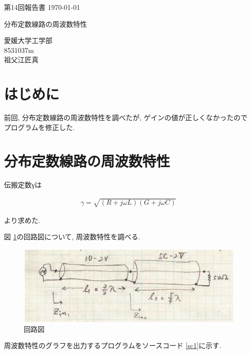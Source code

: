 \documentclass[a4j,12pt,]{jarticle}
\begin{document}
{\noindent\small 第14回報告書 \hfill\today}
\begin{center}
  {\Large 分布定数線路の周波数特性}
\end{center}
\begin{flushright}
  愛媛大学工学部 \\
  8531037m \\
  祖父江匠真 \\
\end{flushright}

\section{はじめに}

前回, 分布定数線路の周波数特性を調べたが, ゲインの値が正しくなかったのでプログラムを修正した.

\section{分布定数線路の周波数特性}

伝搬定数γは

\begin{eqnarray}
  \gamma =  \sqrt{(R + j\omega L)(G + j\omega C)}
\end{eqnarray}

より求めた.

図 \ref{p3}の回路図について, 周波数特性を調べる.

\begin{figure}[H]
  \begin{center}
    \includegraphics[width=140mm]{circuit.png}
    \caption{回路図}
    \label{p3}
  \end{center}
\end{figure}

周波数特性のグラフを出力するプログラムをソースコード \ref{sc1}に示す.



\newpage
\end{document}
